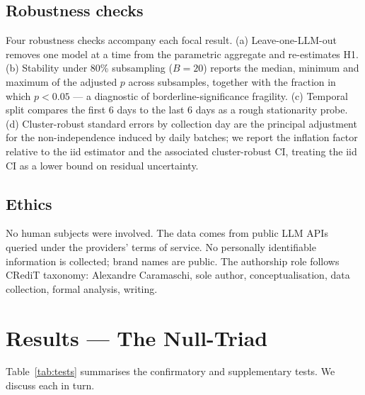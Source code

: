 \documentclass[preprint,12pt,authoryear]{elsarticle}
\begin{document}
\subsection{Robustness checks}
Four robustness checks accompany each focal result. (a) Leave-one-LLM-out removes one model at a time from the parametric aggregate and re-estimates H1. (b) Stability under 80\% subsampling ($B=20$) reports the median, minimum and maximum of the adjusted $p$ across subsamples, together with the fraction in which $p<0.05$ --- a diagnostic of borderline-significance fragility. (c) Temporal split compares the first 6 days to the last 6 days as a rough stationarity probe. (d) Cluster-robust standard errors by collection day are the principal adjustment for the non-independence induced by daily batches; we report the inflation factor relative to the iid estimator and the associated cluster-robust CI, treating the iid CI as a lower bound on residual uncertainty.

\subsection{Ethics}
No human subjects were involved. The data comes from public LLM APIs queried under the providers' terms of service. No personally identifiable information is collected; brand names are public. The authorship role follows CRediT taxonomy: Alexandre Caramaschi, sole author, conceptualisation, data collection, formal analysis, writing.

\section{Results --- The Null-Triad}\label{sec:results}

Table~\ref{tab:tests} summarises the confirmatory and supplementary tests. We discuss each in turn.
\end{document}
